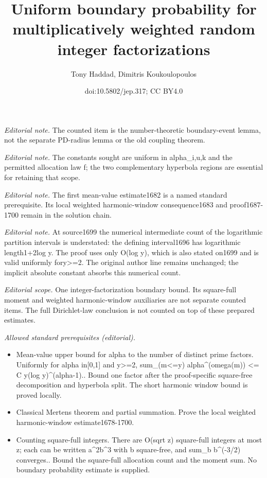 \documentclass[10pt,a4paper]{article}
\title{Uniform boundary probability for multiplicatively weighted random integer factorizations}
\author{Tony Haddad, Dimitris Koukoulopoulos}
\date{doi:10.5802/jep.317; CC BY4.0}
\theoremstyle{plain}
\theoremstyle{definition}
\begin{document}
\maketitle
\noindent\textit{Editorial note.} The counted item is the number-theoretic boundary-event lemma, not the separate PD-radius lemma or the old coupling theorem.\par\medskip
\noindent\textit{Editorial note.} The constants sought are uniform in alpha\_i,u,k and the permitted allocation law f; the two complementary hyperbola regions are essential for retaining that scope.\par\medskip
\noindent\textit{Editorial note.} The first mean-value estimate1682 is a named standard prerequisite. Its local weighted harmonic-window consequence1683 and proof1687-1700 remain in the solution chain.\par\medskip
\noindent\textit{Editorial note.} At source1699 the numerical intermediate count of the logarithmic partition intervals is understated: the defining interval1696 has logarithmic length1+2log y. The proof uses only O(log y), which is also stated on1699 and is valid uniformly fory>=2. The original author line remains unchanged; the implicit absolute constant absorbs this numerical count.\par\medskip
\noindent\textit{Editorial scope.} One integer-factorization boundary bound. Its square-full moment and weighted harmonic-window auxiliaries are not separate counted items. The full Dirichlet-law conclusion is not counted on top of these prepared estimates.\par\medskip
\noindent\textit{Allowed standard prerequisites (editorial).}\begin{itemize}
\item Mean-value upper bound for alpha to the number of distinct prime factors. Uniformly for alpha in[0,1] and y>=2, sum\_(m<=y) alpha\textasciicircum{}(omega(m)) <= C y(log y)\textasciicircum{}(alpha-1).. Bound one factor after the proof-specific square-free decomposition and hyperbola split. The short harmonic window bound is proved locally.
\item Classical Mertens theorem and partial summation. Prove the local weighted harmonic-window estimate1678-1700.
\item Counting square-full integers. There are O(sqrt z) square-full integers at most z; each can be written a\textasciicircum{}2b\textasciicircum{}3 with b square-free, and sum\_b b\textasciicircum{}(-3/2) converges.. Bound the square-full allocation count and the moment sum. No boundary probability estimate is supplied.
\end{itemize}\medskip
\end{document}
